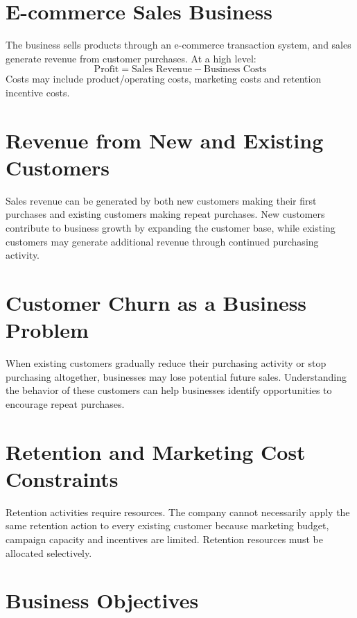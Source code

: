 \section{E-commerce Sales Business}
\label{sec:2-1}

The business sells products through an e-commerce transaction system, and sales generate revenue from customer purchases. At a high level:
\begin{equation*}
    \text{Profit} = \text{Sales Revenue} - \text{Business Costs}
\end{equation*}
Costs may include product/operating costs, marketing costs and retention incentive costs.

\section{Revenue from New and Existing Customers}
\label{sec:2-2}

Sales revenue can be generated by both new customers making their first purchases and existing customers making repeat purchases. New customers contribute to business growth by expanding the customer base, while existing customers may generate additional revenue through continued purchasing activity.

\section{Customer Churn as a Business Problem}
\label{sec:2-3}

When existing customers gradually reduce their purchasing activity or stop purchasing altogether, businesses may lose potential future sales. Understanding the behavior of these customers can help businesses identify opportunities to encourage repeat purchases.

\section{Retention and Marketing Cost Constraints}
\label{sec:2-4}

Retention activities require resources. The company cannot necessarily apply the same retention action to every existing customer because marketing budget, campaign capacity and incentives are limited. Retention resources must be allocated selectively.

\section{Business Objectives}
\label{sec:2-5}

